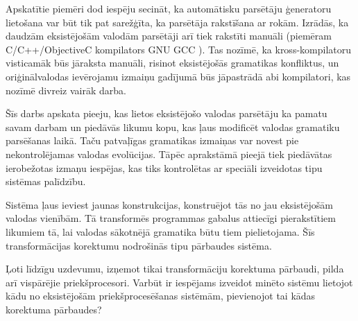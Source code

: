 %

Apskatītie piemēri dod iespēju secināt, ka automātisku parsētāju ģeneratoru lietošana var būt tik pat sarežģīta, ka parsētāja rakstīšana ar rokām. Izrādās, ka daudzām eksistējošām valodām parsētāji arī tiek rakstīti manuāli (piemēram C/C++/ObjectiveC kompilators GNU GCC \cite{GCC}). Tas nozīmē, ka kross-kompilatoru visticamāk būs jāraksta manuāli, risinot eksistējošās gramatikas konfliktus, un oriģinālvalodas ievērojamu izmaiņu gadījumā būs jāpastrādā abi kompilatori, kas nozīmē divreiz vairāk darba. 

Šīs darbs apskata pieeju, kas lietos eksistējošo valodas parsētāju ka pamatu savam darbam un piedāvās likumu kopu, kas ļaus  modificēt valodas gramatiku parsēšanas laikā. Taču patvaļīgas gramatikas izmaiņas var novest pie nekontrolējamas valodas evolūcijas. Tāpēc aprakstāmā pieejā tiek piedāvātas ierobežotas izmaņu iespējas, kas tiks kontrolētas ar speciāli izveidotas tipu sistēmas palīdzību.

Sistēma ļaus ieviest jaunas konstrukcijas, konstruējot tās no jau eksistējošām valodas vienībām. Tā transformēs programmas gabalus attiecīgi pierakstītiem likumiem tā, lai valodas sākotnējā gramatika būtu tiem pielietojama. Šīs transformācijas korektumu nodrošinās tipu pārbaudes sistēma.

Ļoti līdzīgu uzdevumu, izņemot tikai transformāciju korektuma pārbaudi, pilda arī vispārējie priekšprocesori. Varbūt ir iespējams izveidot minēto sistēmu lietojot kādu no eksistējošām priekšprocesēšanas sistēmām, pievienojot tai kādas korektuma pārbaudes?

